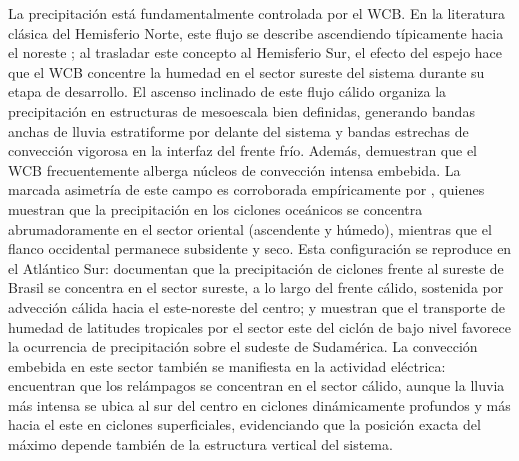 La precipitación está fundamentalmente controlada por el WCB.
En la literatura clásica del Hemisferio Norte, este flujo se describe ascendiendo típicamente hacia el noreste \citep{blanchard2021warm}; al trasladar este concepto al Hemisferio Sur, el efecto del espejo hace que el WCB concentre la humedad en el sector sureste del sistema durante su etapa de desarrollo.
El ascenso inclinado de este flujo cálido organiza la precipitación en estructuras de mesoescala bien definidas, generando bandas anchas de lluvia estratiforme por delante del sistema y bandas estrechas de convección vigorosa en la interfaz del frente frío.
Además, \citet{oertel2021warm} demuestran que el WCB frecuentemente alberga núcleos de convección intensa embebida.
La marcada asimetría de este campo es corroborada empíricamente por \citet{naud2020evaluation}, quienes muestran que la precipitación en los ciclones oceánicos se concentra abrumadoramente en el sector oriental (ascendente y húmedo), mientras que el flanco occidental permanece subsidente y seco.
Esta configuración se reproduce en el Atlántico Sur: \citet{gozzo2013air} documentan que la precipitación de ciclones frente al sureste de Brasil se concentra en el sector sureste, a lo largo del frente cálido, sostenida por advección cálida hacia el este-noreste del centro; y \citet{vera2002cold} muestran que el transporte de humedad de latitudes tropicales por el sector este del ciclón de bajo nivel favorece la ocurrencia de precipitación sobre el sudeste de Sudamérica. La convección embebida en este sector también se manifiesta en la actividad eléctrica: \citet{pepler2020dimensional} encuentran que los relámpagos se concentran en el sector cálido, aunque la lluvia más intensa se ubica al sur del centro en ciclones dinámicamente profundos y más hacia el este en ciclones superficiales, evidenciando que la posición exacta del máximo depende también de la estructura vertical del sistema.

